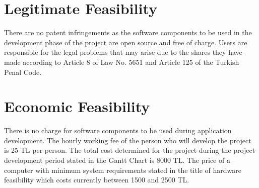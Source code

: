 \section{Legitimate Feasibility}
There are no patent infringements as the software components to be used in the development phase of the project are open source and free of charge. Users are responsible for the legal problems that may arise due to the shares they have made according to Article 8 of Law No. 5651 and Article 125 of the Turkish Penal Code.


\section{Economic Feasibility}
There is no charge for software components to be used during application development. The hourly working fee of the person who will develop the project is 25 TL per person. The total cost determined for the project during the project development period stated in the Gantt Chart is 8000 TL. The price of a computer with minimum system requirements stated in the title of hardware feasibility which costs currently between 1500 and 2500 TL.




